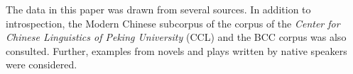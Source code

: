 The data in this paper was drawn from several sources.
In addition to introspection, the Modern Chinese subcorpus of the corpus of the \textit{Center for Chinese Linguistics of Peking University} ({CCL}) \citep{Zhanetal2003, Zhanetal2019} and the BCC corpus \citep{BCC} was also consulted. 
Further, examples from novels and plays written by native speakers were considered.